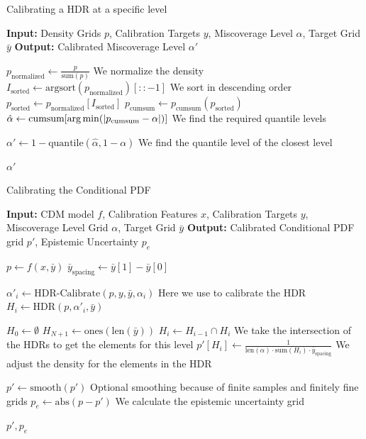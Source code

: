 \begin{algorithm}
    \caption{Calibrating a HDR at a specific level}\label{alg:calibrate_hdr}
    \begin{algorithmic}
        \STATE\textbf{Input:} Density Grids $p$, Calibration Targets $y$, Miscoverage Level $\alpha$, Target Grid $\bar{y}$
        \STATE\textbf{Output:} Calibrated Miscoverage Level $\alpha'$

        \STATE$p_{\text{normalized}} \leftarrow \frac{p}{\text{sum}(p)}$ We normalize the density
        \STATE$I_{\text{sorted}} \leftarrow \text{argsort}(p_{\text{normalized}})[::-1]$ We sort in descending order
        \STATE$p_{\text{sorted}} \leftarrow p_{\text{normalized}}[I_{\text{sorted}}]$
        \STATE$p_{\text{cumsum}} \leftarrow p_{\text{cumsum}}(p_{\text{sorted}})$
        \STATE$\hat{\alpha} \leftarrow \text{cumsum}[\operatorname*{arg\,min}(|p_{\text{cumsum}} - \alpha|)]$ We find the required quantile levels

        \STATE$\alpha' \leftarrow 1 - \text{quantile}(\hat{\alpha}, 1 - \alpha)$ We find the quantile level of the closest level

        \RETURN$\alpha'$

    \end{algorithmic}
\end{algorithm}

\begin{algorithm}
    \caption{Calibrating the Conditional PDF}\label{alg:calibrate_pdf}
    \begin{algorithmic}
        \STATE\textbf{Input:} CDM model $f$, Calibration Features $x$, Calibration Targets $y$, Miscoverage Level Grid $\alpha$, Target Grid $\bar{y}$
        \STATE\textbf{Output:} Calibrated Conditional PDF grid $p'$, Epistemic Uncertainty $p_e$

        \STATE$p \leftarrow f(x, \bar{y})$
        \STATE$\bar{y}_{\text{spacing}} \leftarrow \bar{y}[1] - \bar{y}[0]$

        \STATE$\alpha'_i \leftarrow \text{HDR-Calibrate}(p, y, \bar{y}, \alpha_i)$ Here we use  to calibrate the HDR
        \STATE$H_i \leftarrow \text{HDR}(p, \alpha'_i, \bar{y})$
        \ENDFOR%

        \STATE$H_0 \leftarrow \emptyset$
        \STATE$H_{N+1} \leftarrow \text{ones}(\text{len}(\bar{y}))$
        \STATE$H_i \leftarrow H_{i - 1} \cap H_i$ We take the intersection of the HDRs to get the elements for this level
        \STATE$p'[H_i] \leftarrow \frac{1}{\text{len}(\alpha) \cdot \text{sum}(H_i) \cdot \bar{y}_{\text{spacing}}}$ We adjust the density for the elements in the HDR
        \ENDFOR%

        \STATE$p' \leftarrow \text{smooth}(p')$ Optional smoothing because of finite samples and finitely fine grids
        \STATE$p_e \leftarrow \text{abs}(p - p')$ We calculate the epistemic uncertainty grid

        \RETURN$p', p_e$
    \end{algorithmic}
\end{algorithm}

